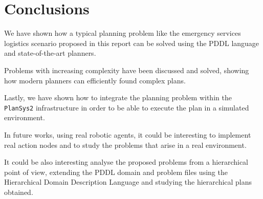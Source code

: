 \section{Conclusions}
\label{sec5}

We have shown how a typical planning problem like the emergency services logistics scenario 
proposed in this report can be solved using the PDDL language and state-of-the-art planners.

Problems with increasing complexity have been discussed and solved, showing how modern planners can 
efficiently found complex plans.

Lastly, we have shown how to integrate the planning problem within the \texttt{PlanSys2} infrastructure
in order to be able to execute the plan in a simulated environment.

In future works, using real robotic agents, it could be interesting to implement real action nodes
and to study the problems that arise in a real environment.


It could be also interesting analyse the proposed problems from a hierarchical point of view, extending the 
PDDL domain and problem files using the Hierarchical Domain Description Language \cite{hddl} and studying 
the hierarchical plans obtained.

